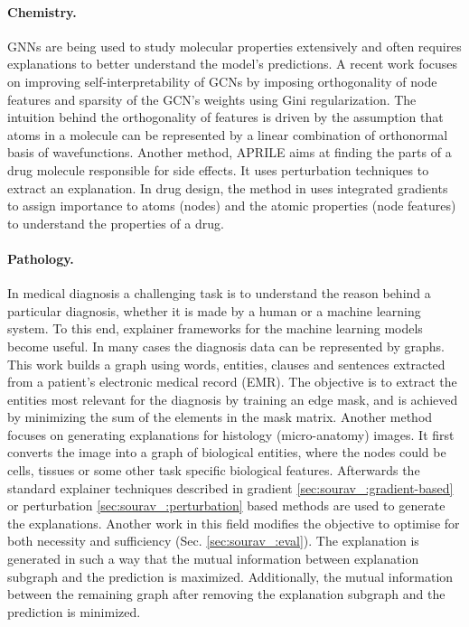 \paragraph{Chemistry.} GNNs are being used to study molecular properties extensively and often requires explanations to better understand the model's predictions. A recent work \cite{henderson2021improving} focuses on improving self-interpretability of GCNs by imposing orthogonality of node features and sparsity of the GCN's weights using Gini regularization. The intuition behind the orthogonality of features is driven by the assumption that atoms in a molecule can be represented by a linear combination of orthonormal basis of wavefunctions. Another method, APRILE \cite{xu2021aprile} aims at finding the parts of a drug molecule responsible for side effects. It uses perturbation techniques to extract an explanation. In drug design, the method in \cite{jimenez2021coloring} uses integrated gradients \cite{sundararajan2017axiomatic} to assign importance to atoms (nodes) and the atomic properties (node features) to understand the properties of a drug.



\paragraph{Pathology.} In medical diagnosis a challenging task is to understand the reason behind a particular diagnosis, whether it is made by a human or a machine learning system. To this end, explainer frameworks for the machine learning models become useful. In many cases the diagnosis data can be represented by graphs. This work \cite{wu2021counterfactual} builds a graph using words, entities, clauses and sentences extracted from a patient's electronic medical record (EMR). The objective is to extract the entities most relevant for the diagnosis by training an edge mask, and is achieved by minimizing the sum of the elements in the mask matrix. Another method~\cite{jaume2021quantifying} focuses on generating explanations for histology (micro-anatomy) images. It first converts the image into a graph of biological entities, where the nodes could be cells, tissues or some other task specific biological features. Afterwards the standard explainer techniques described in gradient \ref{sec:sourav_:gradient-based} or perturbation \ref{sec:sourav_:perturbation} based methods are used to generate the explanations. Another work \cite{yu2021towards} in this field modifies the objective to optimise for both necessity and sufficiency (Sec. \ref{sec:sourav_:eval}). The explanation is generated in such a way that the mutual information between explanation subgraph and the prediction is maximized. Additionally, the mutual information between the remaining graph after removing the explanation subgraph and the prediction is minimized. %




